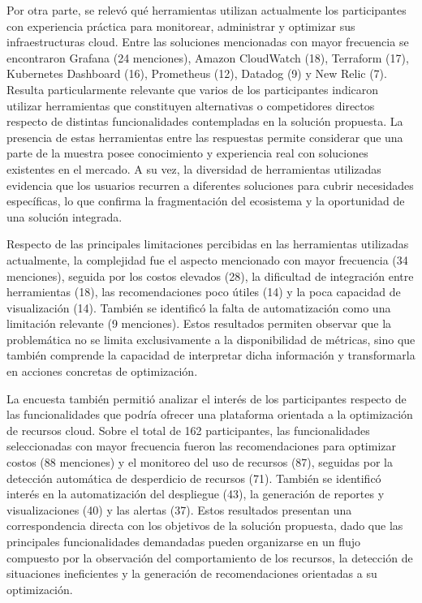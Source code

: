 Por otra parte, se relevó qué herramientas utilizan actualmente los participantes con experiencia práctica para monitorear, administrar y optimizar sus infraestructuras cloud. Entre las soluciones mencionadas con mayor frecuencia se encontraron Grafana (24 menciones), Amazon CloudWatch (18), Terraform (17), Kubernetes Dashboard (16), Prometheus (12), Datadog (9) y New Relic (7). Resulta particularmente relevante que varios de los participantes indicaron utilizar herramientas que constituyen alternativas o competidores directos respecto de distintas funcionalidades contempladas en la solución propuesta. La presencia de estas herramientas entre las respuestas permite considerar que una parte de la muestra posee conocimiento y experiencia real con soluciones existentes en el mercado. A su vez, la diversidad de herramientas utilizadas evidencia que los usuarios recurren a diferentes soluciones para cubrir necesidades específicas, lo que confirma la fragmentación del ecosistema y la oportunidad de una solución integrada.

Respecto de las principales limitaciones percibidas en las herramientas utilizadas actualmente, la complejidad fue el aspecto mencionado con mayor frecuencia (34 menciones), seguida por los costos elevados (28), la dificultad de integración entre herramientas (18), las recomendaciones poco útiles (14) y la poca capacidad de visualización (14). También se identificó la falta de automatización como una limitación relevante (9 menciones). Estos resultados permiten observar que la problemática no se limita exclusivamente a la disponibilidad de métricas, sino que también comprende la capacidad de interpretar dicha información y transformarla en acciones concretas de optimización.

La encuesta también permitió analizar el interés de los participantes respecto de las funcionalidades que podría ofrecer una plataforma orientada a la optimización de recursos cloud. Sobre el total de 162 participantes, las funcionalidades seleccionadas con mayor frecuencia fueron las recomendaciones para optimizar costos (88 menciones) y el monitoreo del uso de recursos (87), seguidas por la detección automática de desperdicio de recursos (71). También se identificó interés en la automatización del despliegue (43), la generación de reportes y visualizaciones (40) y las alertas (37). Estos resultados presentan una correspondencia directa con los objetivos de la solución propuesta, dado que las principales funcionalidades demandadas pueden organizarse en un flujo compuesto por la observación del comportamiento de los recursos, la detección de situaciones ineficientes y la generación de recomendaciones orientadas a su optimización.

